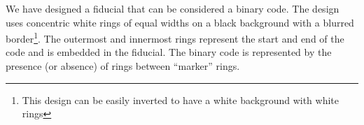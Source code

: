 \documentclass[runningheads]{llncs}
\begin{document}

We have designed a fiducial that can be considered a binary code.  The design
uses concentric white rings of equal widths on a black background with a
blurred border\footnote{This design can be easily inverted to have a white background with white rings}. The outermost and innermost rings represent the start and end
of the code and is embedded in the fiducial.  The binary code is represented by the presence (or absence) of rings between ``marker'' rings.
\end{document}
